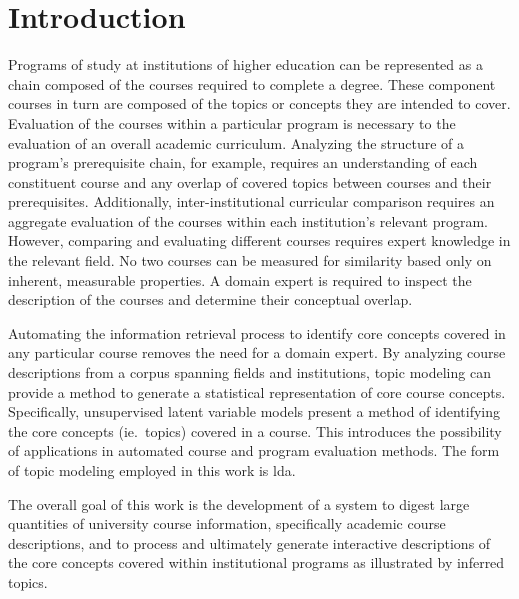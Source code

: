 \section{Introduction}
\label{sec:introduction}


Programs of study at institutions of higher education can be represented as a chain composed of the courses required to complete a degree.
These component courses in turn are composed of the topics or concepts they are intended to cover.
Evaluation of the courses within a particular program is necessary to the evaluation of an overall academic curriculum.
Analyzing the structure of a program's prerequisite chain, for example, requires an understanding of each constituent course and any overlap of covered topics between courses and their prerequisites.
Additionally, inter-institutional curricular comparison requires an aggregate evaluation of the courses within each institution's relevant program.
However, comparing and evaluating different courses requires expert knowledge in the relevant field.
No two courses can be measured for similarity based only on inherent, measurable properties.
A domain expert is required to inspect the description of the courses and determine their conceptual overlap.


Automating the information retrieval process to identify core concepts covered in any particular course removes the need for a domain expert.
By analyzing course descriptions from a corpus spanning fields and institutions, topic modeling can provide a method to generate a statistical representation of core course concepts.
Specifically, unsupervised latent variable models present a method of identifying the core concepts (ie.\ topics) covered in a course.
This introduces the possibility of applications in automated course and program evaluation methods.
The form of topic modeling employed in this work is \acf{lda}.


The overall goal of this work is the development of a system to digest large quantities of university course information, specifically academic course descriptions, and to process and ultimately generate interactive descriptions of the core concepts covered within institutional programs as illustrated by inferred topics.


